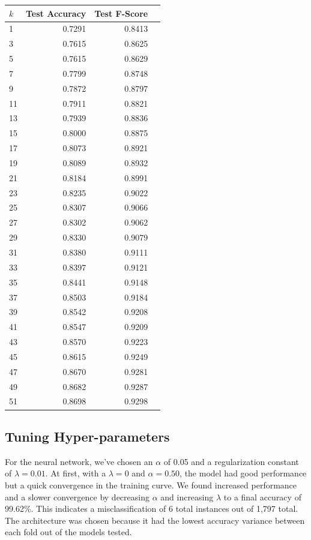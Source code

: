 \documentclass{article}
\begin{document}
\begin{minipage}{0.49\textwidth}
    \centering
    \vfill
    \begin{tabular}{lrrr}
        \toprule
        $k$ & Test Accuracy & Test F-Score \\
        \midrule
        1 & {0.7291} & {0.8413} \\
        3 & {0.7615} & {0.8625} \\
        5 & {0.7615} & {0.8629} \\
        7 & {0.7799} & {0.8748} \\
        9 & {0.7872} & {0.8797} \\
        11 & {0.7911} & {0.8821} \\
        13 & {0.7939} & {0.8836} \\
        15 & {0.8000} & {0.8875} \\
        17 & {0.8073} & {0.8921} \\
        19 & {0.8089} & {0.8932} \\
        21 & {0.8184} & {0.8991} \\
        23 & {0.8235} & {0.9022} \\
        25 & {0.8307} & {0.9066} \\
        27 & {0.8302} & {0.9062} \\
        29 & {0.8330} & {0.9079} \\
        31 & {0.8380} & {0.9111} \\
        33 & {0.8397} & {0.9121} \\
        35 & {0.8441} & {0.9148} \\
        37 & {0.8503} & {0.9184} \\
        39 & {0.8542} & {0.9208} \\
        41 & {0.8547} & {0.9209} \\
        43 & {0.8570} & {0.9223} \\
        45 & {0.8615} & {0.9249} \\
        47 & {0.8670} & {0.9281} \\
        49 & {0.8682} & {0.9287} \\
        51 & {0.8698} & {0.9298} \\
        \bottomrule
    \end{tabular}
    \vfill
\end{minipage}
\restoregeometry

\subsection*{Tuning Hyper-parameters}
For the neural network, we've chosen an $\alpha$ of 0.05 and a regularization constant of $\lambda=0.01$. At first, with a $\lambda=0$ and $\alpha=0.50$, the model had good performance but a quick convergence in the training curve.
We found increased performance and a slower convergence by decreasing $\alpha$ and increasing $\lambda$ to a final accuracy of 99.62\%. This indicates a misclassification of 6 total instances out of 1,797 total.
The architecture was chosen because it had the lowest accuracy variance between each fold out of the models tested.
\\
\end{document}
